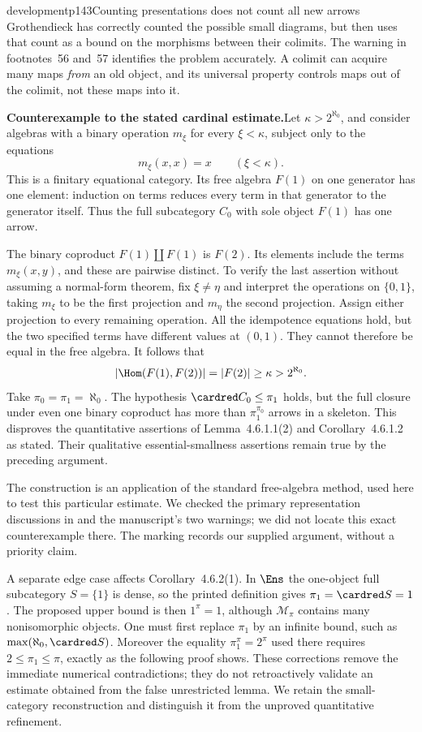 \begin{dcomment}{development}{p143}{Counting presentations does not count all new arrows}
Grothendieck has correctly counted the possible small diagrams, but then uses that count as a bound on the morphisms between their colimits. The warning in footnotes~56 and~57 identifies the problem accurately. A colimit can acquire many maps \emph{from} an old object, and its universal property controls maps out of the colimit, not these maps into it.

\textbf{Counterexample to the stated cardinal estimate.}\ours\quad Let $\kappa>2^{\aleph_0}$, and consider algebras with a binary operation $m_\xi$ for every $\xi<\kappa$, subject only to the equations
\[
 m_\xi(x,x)=x \qquad(\xi<\kappa).
\]
This is a finitary equational category. Its free algebra $F(1)$ on one generator has one element: induction on terms reduces every term in that generator to the generator itself. Thus the full subcategory $C_0$ with sole object $F(1)$ has one arrow.

The binary coproduct $F(1)\amalg F(1)$ is $F(2)$. Its elements include the terms $m_\xi(x,y)$, and these are pairwise distinct. To verify the last assertion without assuming a normal-form theorem, fix $\xi\neq\eta$ and interpret the operations on $\{0,1\}$, taking $m_\xi$ to be the first projection and $m_\eta$ the second projection. Assign either projection to every remaining operation. All the idempotence equations hold, but the two specified terms have different values at $(0,1)$. They cannot therefore be equal in the free algebra. It follows that
\[
 |\Hom(F(1),F(2))|=|F(2)|\geq\kappa>2^{\aleph_0}.
\]
Take $\pi_0=\pi_1=\aleph_0$. The hypothesis
$\cardred C_0\leq\pi_1$ holds, but the full closure under even one binary coproduct has more than $\pi_1^{\pi_0}$ arrows in a skeleton. This disproves the quantitative assertions of Lemma~4.6.1.1(2) and Corollary~4.6.1.2 as stated. Their qualitative essential-smallness assertions remain true by the preceding argument.

The construction is an application of the standard free-algebra method, used here to test this particular estimate. We checked the primary representation discussions in \citet{AdamekRosicky1994} and the manuscript's two warnings; we did not locate this exact counterexample there. The marking records our supplied argument, without a priority claim.

A separate edge case affects Corollary~4.6.2(1). In $\Ens$ the one-object full subcategory $S=\{1\}$ is dense, so the printed definition gives $\pi_1=\cardred S=1$. The proposed upper bound is then $1^\pi=1$, although $\mathcal M_\pi$ contains many nonisomorphic objects. One must first replace $\pi_1$ by an infinite bound, such as $\max(\aleph_0,\cardred S)$. Moreover the equality $\pi_1^\pi=2^\pi$ used there requires $2\leq\pi_1\leq\pi$, exactly as the following proof shows. These corrections remove the immediate numerical contradictions; they do not retroactively validate an estimate obtained from the false unrestricted lemma. We retain the small-category reconstruction and distinguish it from the unproved quantitative refinement.
\end{dcomment}

